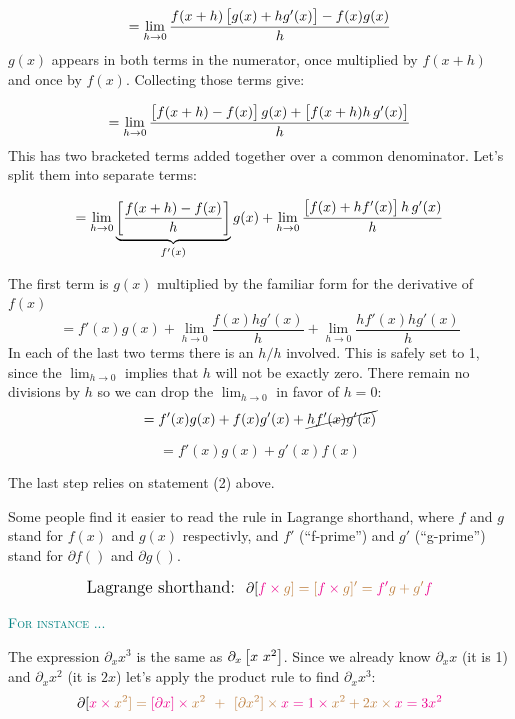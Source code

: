 \documentclass[
  letterpaper,
  DIV=11,
  numbers=noendperiod,
  oneside]{scrreprt}
\newenvironment{example}%
{%
\textcolor{teal}{\hrulefill}%
  \par\vspace{.3\baselineskip}%
  \textcolor{teal}{\scshape For instance ...}%
  \par\vspace{\baselineskip}%
}%
{\textcolor{teal}{\hrulefill}}
\begin{document}
\[= \lim_{h\rightarrow 0} \frac{f(x+h) \left[\strut g(x) + h g'(x) \right] - f(x) g(x)}{h} \]
\(g(x)\) appears in both terms in the numerator, once multiplied by
\(f(x+h)\) and once by \(f(x)\). Collecting those terms give:

\[=\lim_{h\rightarrow 0}\frac{\left[\strut f(x+ h) - f(x)\right]  g(x) + \left[\strut f(x+h) h\, g'(x)\right]}{h}\]
This has two bracketed terms added together over a common denominator.
Let's split them into separate terms:

\[=\lim_{h\rightarrow 0}\underbrace{\left[\strut \frac{f(x+h) - f(x)}{h}\right]}_{f'(x)} g(x) + \lim_{h\rightarrow 0}\frac{\left[\strut f(x) + h f'(x)\right]h\,g'(x)}{h}\]

The first term is \(g(x)\) multiplied by the familiar form for the
derivative of \(f(x)\)
\[= f'(x) g(x) + \lim_{h\rightarrow 0}\frac{f(x) h g'(x)}{h} + \lim_{h\rightarrow 0}\frac{h f'(x) h g'(x)}{h}\]
In each of the last two terms there is an \(h/h\) involved. This is
safely set to 1, since the \(\lim_{h\rightarrow 0}\) implies that \(h\)
will not be exactly zero. There remain no divisions by \(h\) so we can
drop the \(\lim_{h\rightarrow 0}\) in favor of \(h=0\):
\[= f'(x) g(x) + f(x) g'(x) + \cancel{h f'(x) g'(x)}\]

\[=f'(x) g(x) + g'(x) f(x)\]

The last step relies on statement (2) above.

Some people find it easier to read the rule in Lagrange shorthand, where
\(f\) and \(g\) stand for \(f(x)\) and \(g(x)\) respectivly, and \(f'\)
(``f-prime'') and \(g'\) (``g-prime'') stand for \(\partial f()\) and
\(\partial g()\).

\[\large\text{Lagrange shorthand:}\ \   \partial[\color{magenta}f \times \color{brown}g] = [\color{magenta}f \times \color{brown}g]' = \color{magenta}{f'}\color{brown}g + \color{brown}{g'}\color{magenta}f\]

\begin{example}
The expression \(\partial_x x^3\) is the same as
\(\partial_x \left[\strut x\  x^2\right]\). Since we already know
\(\partial_x x\) (it is 1) and \(\partial_x x^2\) (it is \(2x\)) let's
apply the product rule to find \(\partial_x x^3\):
\[\large\partial [\color{magenta}x \times \color{brown}{x^2}] = \color{magenta}{[\partial x]} \times \color{brown}{x^2} \ +\  \color{brown}{[\partial x^2]} \times \color{magenta}x =\color{magenta}1\times \color{brown}{x^2} + \color{brown}{2x} \times \color{magenta}x = 3 x^2\]

\end{example}
\end{document}
